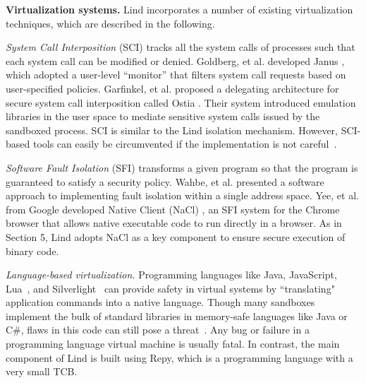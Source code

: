 
\textbf{Virtualization systems.}
Lind incorporates a number of existing virtualization techniques, which are
described in the following.

\textit{System Call Interposition} (SCI) tracks all the system calls of processes such 
that each system call can be modified or denied.
Goldberg, et al. developed Janus \cite{Janus0:96, Janus:99}, 
which adopted a user-level ``monitor'' that filters system call requests based on
user-specified policies. Garfinkel, et al. proposed a delegating architecture for secure system call interposition 
called Ostia \cite{SCI-04}. Their system introduced emulation libraries in the user space
to mediate sensitive system calls issued by the sandboxed process. SCI is similar to
 the Lind isolation mechanism. However, SCI-based tools can easily be circumvented
 if the implementation is not careful~\cite{Problems-SCI}.

\textit{Software Fault Isolation} (SFI) transforms a given program so that the
program is guaranteed to satisfy a security policy.
Wahbe, et al. \cite{SFI:93} presented a software approach to implementing
fault isolation within a single address space.
Yee, et al. from Google developed Native Client (NaCl) \cite{NaCl-09},
an SFI system for the Chrome browser that allows native executable code to run directly in a
browser. As in Section 5, Lind adopts NaCl as a key component to ensure secure execution
of binary code.

\textit{Language-based virtualization.}
Programming languages like Java, JavaScript, Lua~\cite{Lua}, and
Silverlight~\cite{Silverlight} can provide safety in virtual systems by
``translating" application commands into a native language.
%
Though many sandboxes implement the bulk of standard libraries in
memory-safe languages like Java or C\#, flaws in this code can
still pose a threat~\cite{JavaBugs, Java-Lessons}.
Any bug or failure in a programming language virtual
machine is usually fatal. In contrast, the main component of Lind
is built using Repy, which is a programming language with a very small TCB.

